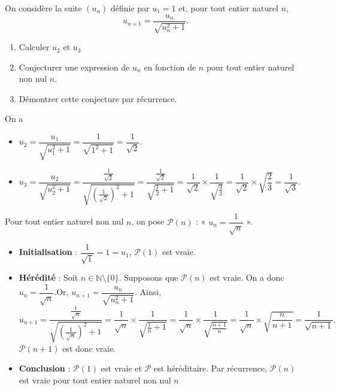 \documentclass[11pt,fleqn]{book} %
\begin{document}
\begin{exercise}
On considère la suite \((u_n)\) définie par \(u_1=1\) et, pour tout entier naturel \(n\), \[u_{n+1}= \dfrac{u_n}{\sqrt{u_n^2+1}}.\]
\begin{enumerate}
 	\item Calculer \(u_2\) et \(u_3\)
 	\item Conjecturer une expression de \(u_n\) en fonction de \(n\) pour tout entier naturel non nul $n$.
 	\item Démontrer cette conjecture par récurrence.
\end{enumerate}\end{exercise}
\begin{solution}On a
\begin{itemize}\item \( u_2 = \dfrac{u_1}{\sqrt{u_1^2+1}}=\dfrac{1}{\sqrt{1^2+1}}=\dfrac{1}{\sqrt{2}}\).
 	\item \( u_3 = \dfrac{u_2}{\sqrt{u_2^2+1}}=\dfrac{\frac{1}{\sqrt{2}}}{\sqrt{\left(\frac{1}{\sqrt{2}}\right)^2+1}}=\dfrac{\frac{1}{\sqrt{2}}}{\sqrt{\frac{1}{2}+1}}=\dfrac{1}{\sqrt{2}} \times \dfrac{1}{\sqrt{\frac{3}{2}}} = \dfrac{1}{\sqrt{2}} \times \sqrt{\dfrac{2}{3}} = \dfrac{1}{\sqrt{3}}\).
\end{itemize}
Pour tout entier naturel non nul \(n\), on pose \(\mathcal{P}(n)\) : « \(u_n=\dfrac{1}{\sqrt{n}}\) ».
\begin{itemize}
\item \textbf{Initialisation} : \( \dfrac{1}{\sqrt{1}}=1=u_1\), \( \mathcal{P}(1) \) est vraie.
\item \textbf{Hérédité} : Soit \(n\in\mathbb{N}\setminus \{0\}\). Supposons que \( \mathcal{P}(n)\) est vraie. On a donc \(u_n=\dfrac{1}{\sqrt{n}}\).Or, $u_{n+1}= \dfrac{u_n}{\sqrt{u_n^2+1}}$. Ainsi,
\[u_{n+1}= \dfrac{\frac{1}{\sqrt{n}}}{\sqrt{\left(\frac{1}{\sqrt{n}}\right)^2+1}}=\dfrac{1}{\sqrt{n}} \times \dfrac{1}{\sqrt{\frac{1}{n}+1}}=\dfrac{1}{\sqrt{n}} \times \dfrac{1}{\sqrt{\frac{n+1}{n}}}=\dfrac{1}{\sqrt{n}} \times \sqrt{\dfrac{n}{n+1}} = \dfrac{1}{\sqrt{n+1}}.\]\( \mathcal{P}(n+1)\) est donc vraie.
\item \textbf{Conclusion} : \(\mathcal{P}(1)\) est vraie et \(\mathcal{P}\) est héréditaire. Par récurrence, \(\mathcal{P}(n)\) est vraie pour tout entier naturel non nul \(n\)
\end{itemize}\end{solution}
\end{document}
